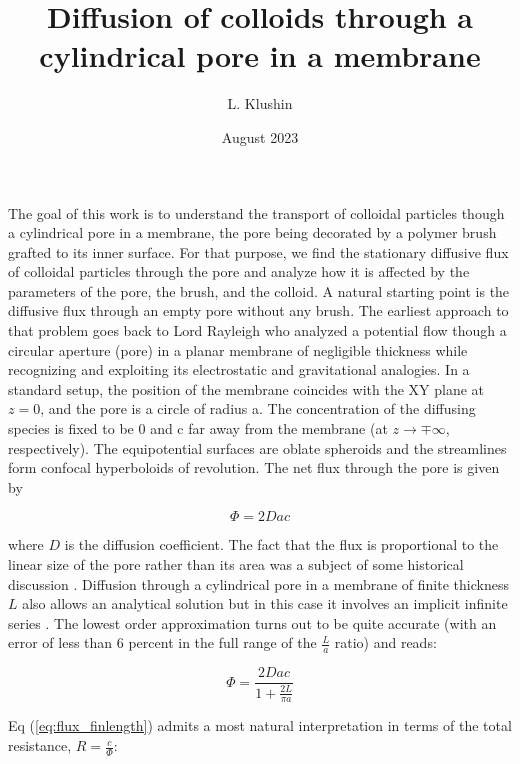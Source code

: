 \documentclass[12pt, a4paper]{article}
\title{Diffusion of colloids through a cylindrical pore in a membrane}
\author{L. Klushin}
\date{August 2023}
\begin{document}
\maketitle




The goal of this work is to understand the transport of colloidal particles though a cylindrical pore in a membrane, the pore being decorated by a polymer brush grafted to its inner surface. For that purpose, we find the stationary diffusive flux of colloidal particles through the pore and analyze how it is affected by the parameters of the pore, the brush, and the colloid. A natural starting point is the diffusive flux through an empty pore without any brush. The earliest approach to that problem goes back to Lord Rayleigh who analyzed a potential flow though a circular aperture (pore) in a planar membrane of negligible thickness while recognizing and exploiting its electrostatic and gravitational analogies\cite{Strutt1878}.  In a standard setup, the position of the membrane coincides with the XY plane at  $z=0$, and the pore is a circle of radius a. The concentration of the diffusing species is fixed to be 0 and c far away from the membrane (at   $z\rightarrow\mp\infty$, respectively).  The equipotential surfaces are oblate spheroids and the streamlines form confocal hyperboloids of revolution\cite{Cooke1966}.
The net flux through the pore is given by


\begin{equation}
\Phi=2Dac\label{eq:flux_Ral}
\end{equation}

\noindent where $D$ is the diffusion coefficient. The fact that the flux is proportional to the linear size of the pore rather than its area was a subject of some historical discussion \cite{Cooke1966}.
Diffusion through a cylindrical pore in a membrane of finite thickness $L$ also allows an analytical solution but in this case it involves an implicit infinite series \cite{Brunn1984}. The lowest order approximation turns out to be quite accurate (with an error of less than 6 percent in the full range of the $\frac{L}{a}$ ratio) and reads:

\begin{equation}
    \Phi=\frac{2Dac}{1+\frac{2L}{\pi a}}\label{eq:flux_finlength}
\end{equation}

Eq (\ref{eq:flux_finlength}) admits a most natural interpretation in terms of the total resistance, $R=\frac{c}{\Phi}$:
\end{document}
